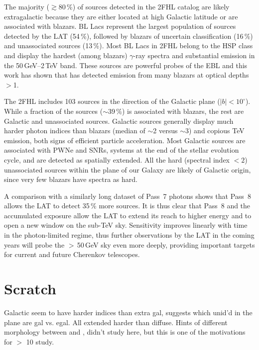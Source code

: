 The majority ($\gtrsim$80\,\%)
of sources detected in the 2FHL catalog are likely extragalactic
because they are either located at high Galactic latitude or are associated with blazars. BL Lacs represent the largest population of sources detected by the LAT 
(54\,\%), followed by blazars of uncertain classification (16\,\%) and unassociated
sources (13\,\%). Most BL Lacs in 2FHL belong to the HSP class and display the hardest
(among blazars) $\gamma$-ray spectra and substantial emission in the 50\,GeV--2\,TeV
band. These sources are powerful probes of the EBL and this work has shown
that \lat{} has detected emission from many blazars at optical depths $>$1.

The 2FHL includes 103 sources in the direction of the Galactic plane ($|b|<10^{\circ}$).
While a fraction of the sources ($\sim$39\,\%) is associated with blazars, the rest
are Galactic and unassociated sources. Galactic sources generally display
much harder photon indices than blazars (median of $\sim$2 versus $\sim$3)
and copious TeV emission, both signs of efficient particle acceleration.
Most Galactic sources are associated with PWNe and SNRs, systems at the end
of the stellar evolution cycle, and are detected as spatially extended.
All the hard (spectral index $<2$) unassociated  sources within the plane
of our Galaxy are likely of Galactic origin, since very few blazars 
have spectra as hard.

A comparison with a similarly long dataset of Pass~7 photons shows that
Pass~8 allows the LAT to detect 35\,\% more sources. It is thus
clear that Pass~8 and the accumulated exposure allow the LAT to extend its reach
to higher energy and to open a new window on the sub-TeV sky. Sensitivity improves linearly with time in the photon-limited regime, thus 
further observations by the LAT in the coming years
will probe the $>$\,50\,GeV sky even more deeply, providing
important targets for current and future 
Cherenkov telescopes.


\section{Scratch}
 Galactic seem to have harder indices than extra gal, suggests which unid'd in the plane are gal vs. egal. All extended harder than diffuse. Hints of different morphology between \twofhl and \twofgl, didn't study here, but this is one of the motivations for $>$ 10 \gev study.
